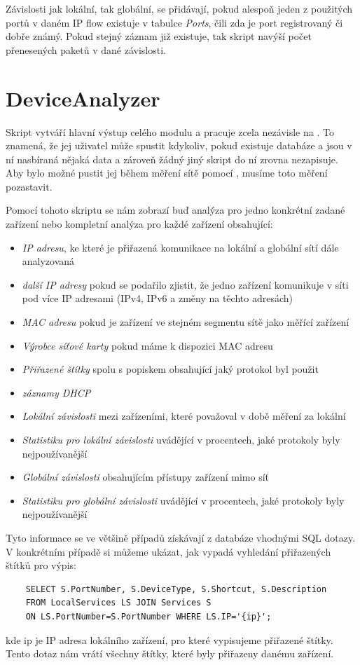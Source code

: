 \documentclass[thesis=B,czech,hidelinks]{FITthesis}[2019/03/21]
\begin{document}
    Závislosti jak lokální, tak globální, se přidávají, pokud alespoň jeden z použitých portů v daném IP flow existuje v tabulce \emph{Ports}, čili zda je port registrovaný či dobře známý. Pokud stejný záznam již existuje, tak skript navýší počet přenesených paketů v dané závislosti.
    
    \section{DeviceAnalyzer}
    Skript  vytváří hlavní výstup celého modulu a pracuje zcela nezávisle na . To znamená, že jej uživatel může spustit kdykoliv, pokud existuje databáze  a jsou v ní nasbíraná nějaká data a zároveň žádný jiný skript do ní zrovna nezapisuje. Aby bylo možné pustit jej během měření sítě pomocí , musíme toto měření pozastavit.
    
    \newpage
    Pomocí tohoto skriptu se nám zobrazí buď analýza pro jedno konkrétní zadané zařízení nebo kompletní analýza pro každé zařízení obsahující:
    \begin{itemize}
        \item \emph{IP adresu}, ke které je přiřazená komunikace na lokální a globální sítí dále analyzovaná
        \item \emph{další IP adresy} pokud se podařilo zjistit, že jedno zařízení komunikuje v síti pod více IP adresami (IPv4, IPv6 a změny na těchto adresách)
        \item \emph{MAC adresu} pokud je zařízení ve stejném segmentu sítě jako měřící zařízení
        \item \emph{Výrobce síťové karty} pokud máme k dispozici MAC adresu
        \item \emph{Přiřazené štítky} spolu s popiskem obsahující jaký protokol byl použit
        \item \emph{záznamy DHCP}
        \item \emph{Lokální závislosti} mezi zařízeními, které  považoval v době měření za lokální
        \item \emph{Statistiku pro lokální závislosti} uvádějící v procentech, jaké protokoly byly nejpoužívanější
        \item \emph{Globální závislosti} obsahujícím přístupy zařízení mimo síť
        \item \emph{Statistiku pro globální závislosti} uvádějící v procentech, jaké protokoly byly nejpoužívanější
    \end{itemize}
    Tyto informace se ve většině případů získávají z databáze vhodnými SQL dotazy. V konkrétním případě si můžeme ukázat, jak vypadá vyhledání přiřazených štítků pro výpis:
    \begin{verbatim}
    SELECT S.PortNumber, S.DeviceType, S.Shortcut, S.Description 
    FROM LocalServices LS JOIN Services S 
    ON LS.PortNumber=S.PortNumber WHERE LS.IP='{ip}';\end{verbatim}
     kde ip je IP adresa lokálního zařízení, pro které vypisujeme přiřazené štítky. Tento dotaz nám vrátí všechny štítky, které byly přiřazeny danému zařízení.
    
\end{document}
